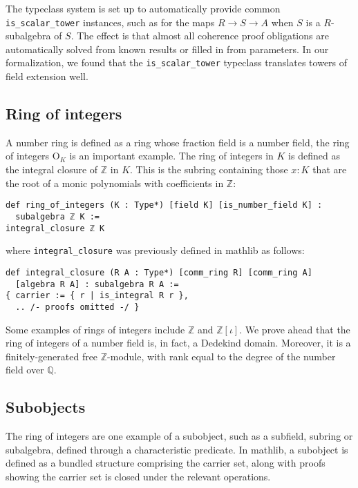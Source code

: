 \documentclass[a4paper,USenglish,cleveref, autoref, thm-restate]{lipics-v2021}
\newcommand{\lean}[1]{\texttt{#1}\xspace} %
\newcommand{\OK}{\mathrm{O}_K}
\newcommand{\Q}{\mathbb{Q}}
\newcommand{\Z}{\mathbb{Z}}
\begin{document}
The typeclass system is set up to automatically provide common \lean{is\_scalar\_tower} instances,
such as for the maps $R \to S \to A$ when $S$ is a $R$-subalgebra of $S$.
The effect is that almost all coherence proof obligations are automatically solved from known results or filled in from parameters.
In our formalization, we found that the \lean{is\_scalar\_tower} typeclass translates towers of field extension well.

\subsection{Ring of integers} \label{sec:ring-of-integers}

A number ring is defined as a ring whose fraction field is a number field, the ring of integers $\OK$ is an important example.
The ring of integers in $K$ is defined as the integral closure of $\Z$ in $K$.
This is the subring containing those $x : K$ that are the root of a monic polynomials with coefficients in $\Z$:
\begin{lstlisting}
def ring_of_integers (K : Type*) [field K] [is_number_field K] :
  subalgebra ℤ K :=
integral_closure ℤ K
\end{lstlisting}
where \lean{integral\_closure} was previously defined in mathlib as follows:
\begin{lstlisting}
def integral_closure (R A : Type*) [comm_ring R] [comm_ring A]
  [algebra R A] : subalgebra R A :=
{ carrier := { r | is_integral R r },
  .. /- proofs omitted -/ }
\end{lstlisting}

Some examples of rings of integers include $\Z$ and $\Z[\iota]$. We prove ahead that the ring of integers of a number field is, in fact, a Dedekind domain. Moreover, it is a finitely-generated free $\Z$-module, with rank equal to the degree of the number field over $\Q$.


\subsection{Subobjects}

The ring of integers are one example of a subobject, such as a subfield, subring or subalgebra, defined through a characteristic predicate.
In mathlib, a subobject is defined as a bundled structure comprising the carrier set,
along with proofs showing the carrier set is closed under the relevant operations.
\end{document}
